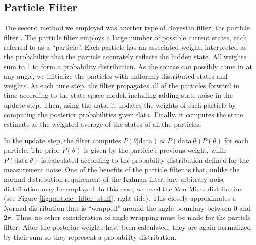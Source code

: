 \documentclass[11pt]{amsart}
\begin{document}
\subsection{Particle Filter}
The second method we employed was another type of Bayesian filter, the particle filter \cite{Particle}. The particle filter employs a large number of possible current states, each referred to 
as a “particle”. Each particle has an associated weight, interpreted as the probability that the particle accurately reflects the hidden state. All weights sum to 1 to form a probability distribution. As the source can possibly 
come in at any angle, we initialize the particles with uniformly distributed states and weights. At each time step, the filter propagates all of the particles forward in time according to the state space 
model, including adding state noise in the update step. Then, using the data, it updates the weights of each particle by computing the posterior probabilities given data. Finally, it computes the state estimate 
as the weighted average of the states of all the particles. 

In the update step, the filter computes $P(\theta|\text{data}) \propto P(\text{data}|\theta)P(\theta)$ for each particle. The prior $P(\theta)$ is given by the particle’s previous weight, while $P(\text{data}|\theta)$ is calculated 
according to the probability distribution defined for the measurement noise. One of the benefits of the particle filter is that, unlike the normal distribution requirement of the Kalman filter, any arbitrary noise 
distribution may be employed. In this case, we used the Von Mises distribution (see Figure \ref{fig:particle_filter_stuff}, right side). This closely approximates a Normal distribution 
that is “wrapped” around the angle boundary between $0$ and $2\pi$. Thus, no other consideration of angle wrapping must be made for the particle filter. After the posterior weights have been calculated, they are again normalized by 
their sum so they represent a probability distribution.
\end{document}
